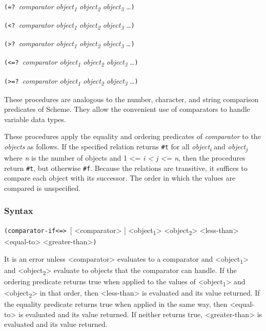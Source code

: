 \texttt{(=?\ }\emph{comparator} \emph{object\textsubscript{1}
object\textsubscript{2} object\textsubscript{3}} \ldots{}\texttt{)}

\texttt{(\textless{}?\ }\emph{comparator} \emph{object\textsubscript{1}
object\textsubscript{2} object\textsubscript{3}} \ldots{}\texttt{)}

\texttt{(\textgreater{}?\ }\emph{comparator}
\emph{object\textsubscript{1} object\textsubscript{2}
object\textsubscript{3}} \ldots{}\texttt{)}

\texttt{(\textless{}=?\ }\emph{comparator} \emph{object\textsubscript{1}
object\textsubscript{2} object\textsubscript{3}} \ldots{}\texttt{)}

\texttt{(\textgreater{}=?\ }\emph{comparator}
\emph{object\textsubscript{1} object\textsubscript{2}
object\textsubscript{3}} \ldots{}\texttt{)}

These procedures are analogous to the number, character, and string
comparison predicates of Scheme. They allow the convenient use of
comparators to handle variable data types.

These procedures apply the equality and ordering predicates of
\emph{comparator} to the \emph{objects} as follows. If the specified
relation returns \texttt{\#t} for all \emph{object\textsubscript{i}} and
\emph{object\textsubscript{j}} where \emph{n} is the number of objects
and 1 \textless{}= \emph{i \textless{} j \textless{}= n}, then the
procedures return \texttt{\#t}, but otherwise \texttt{\#f}. Because the
relations are transitive, it suffices to compare each object with its
successor. The order in which the values are compared is unspecified.

\hypertarget{Syntax}{\subsubsection{Syntax}\label{Syntax}}

\texttt{(comparator-if\textless{}=\textgreater{}\ }{[}
\textless{}comparator\textgreater{} {]}
\textless{}object\textsubscript{1}\textgreater{}
\textless{}object\textsubscript{2}\textgreater{}
\textless{}less-than\textgreater{} \textless{}equal-to\textgreater{}
\textless{}greater-than\textgreater{}\texttt{)}

It is an error unless \textless{}comparator\textgreater{} evaluates to a
comparator and \textless{}object\textsubscript{1}\textgreater{} and
\textless{}object\textsubscript{2}\textgreater{} evaluate to objects
that the comparator can handle. If the ordering predicate returns true
when applied to the values of
\textless{}object\textsubscript{1}\textgreater{} and
\textless{}object\textsubscript{2}\textgreater{} in that order, then
\textless{}less-than\textgreater{} is evaluated and its value returned.
If the equality predicate returns true when applied in the same way,
then \textless{}equal-to\textgreater{} is evaluated and its value
returned. If neither returns true, \textless{}greater-than\textgreater{}
is evaluated and its value returned.

